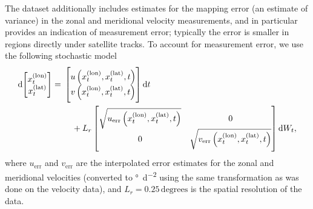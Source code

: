 The dataset additionally includes estimates for the mapping error (an estimate of variance) in the zonal and meridional velocity measurements, and in particular provides an indication of measurement error; typically the error is smaller in regions directly under satellite tracks.
To account for measurement error, we use the following stochastic model
\begin{equation}
	\dif \begin{bmatrix}
		x^{(\mathrm{lon})}_t \\ x^{(\mathrm{lat})}_t
	\end{bmatrix} = \begin{multlined}[t]
		\begin{bmatrix} u\left(x^{(\mathrm{lon})}_t, x^{(\mathrm{lat})}_t, t\right) \\ v\left(x^{(\mathrm{lon})}_t, x^{(\mathrm{lat})}_t, t\right) \end{bmatrix}\dif t \\
		+ L_r\begin{bmatrix}
			\sqrt{u_{\mathrm{err}}\left(x^{(\mathrm{lon})}_t, x^{(\mathrm{lat})}_t, t\right)} & 0                                                                                 \\
			0                                                                                 & \sqrt{v_{\mathrm{err}}\left(x^{(\mathrm{lon})}_t, x^{(\mathrm{lat})}_t, t\right)}
		\end{bmatrix} \dif W_t,
	\end{multlined}
	\label{eqn:natl_sde}
\end{equation}
where \(u_{\mathrm{err}}\) and \(v_{\mathrm{err}}\) are the interpolated error estimates for the zonal and meridional velocities (converted to \unit{\degree\per\square\day} using the same transformation as was done on the velocity data), and \(L_r = 0.25 \mathrm{\,degrees}\) is the spatial resolution of the data.






